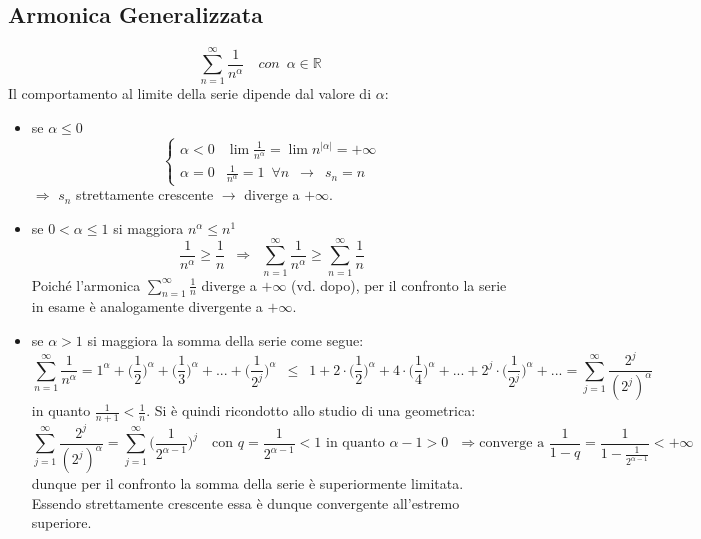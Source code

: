 \documentclass[10pt, oneside]{book}
\theoremstyle{plain}
\begin{document}
\subsection{Armonica Generalizzata}
\[\sum \limits_{n=1}^{\infty} \frac{1}{n^\alpha} \quad con \enspace \alpha \in \mathbb{R}\]
Il comportamento al limite della serie dipende dal valore di $\alpha$:
\begin{itemize}[label=$\ast$]
    \item se $\alpha \leq 0$\\
    \[\begin{cases}
        \alpha < 0 & \lim \frac{1}{n^\alpha} = \lim n^{|\alpha|} = + \infty \\
        \alpha = 0 & \frac{1}{n^\alpha} = 1 \enspace \forall n \enspace \rightarrow \enspace s_n = n
    \end{cases}
    \]
    $\Rightarrow$ $s_n$ strettamente crescente $\rightarrow$ diverge a $+ \infty$.
    \item se $0 < \alpha \leq 1$ si maggiora $n^\alpha \leq n^1$
    \[\frac{1}{n^\alpha} \geq \frac{1}{n} \enspace \Rightarrow \enspace \sum \limits_{n=1}^{\infty} \frac{1}{n^\alpha} \geq \sum \limits_{n=1}^{\infty} \frac{1}{n}\]
    Poiché l'armonica $\displaystyle \sum_{n=1}^{\infty} \frac{1}{n}$ diverge a $+ \infty$ (vd. dopo), per il confronto la serie in esame è analogamente divergente a $+\infty$.
    \item se $\alpha > 1$ si maggiora la somma della serie come segue:
    \[\sum \limits_{n=1}^{\infty} \frac{1}{n^\alpha} = 1^\alpha + \bigg(\frac{1}{2}\bigg)^\alpha + \bigg(\frac{1}{3}\bigg)^\alpha + ... + \bigg(\frac{1}{2^j}\bigg)^\alpha \enspace \leq \enspace 1+ 2\cdot \bigg(\frac{1}{2}\bigg)^\alpha + 4\cdot \bigg(\frac{1}{4}\bigg)^\alpha + ... + 2^j\cdot \bigg(\frac{1}{2^j}\bigg)^\alpha + ... = \sum \limits_{j=1}^{\infty} \frac{2^j}{(2^j)^\alpha}\]
    in quanto $\displaystyle \frac{1}{n+1} < \frac{1}{n}$. Si è quindi ricondotto allo studio di una geometrica:
    \[\sum \limits_{j=1}^{\infty} \frac{2^j}{(2^j)^\alpha} = \sum \limits_{j=1}^{\infty} \bigg(\frac{1}{2^{\alpha-1}}\bigg)^j \quad \textrm{con $q = \frac{1}{2^{\alpha-1}} < 1$ in quanto $\alpha - 1 > 0$ } \Rightarrow \textrm{converge a } \frac{1}{1-q} = \frac{1}{\displaystyle 1 - \frac{1}{2^{\alpha-1}}} < + \infty\]
    dunque per il confronto la somma della serie è superiormente limitata. Essendo strettamente crescente essa è dunque convergente all'estremo superiore.
\end{itemize}
\end{document}
